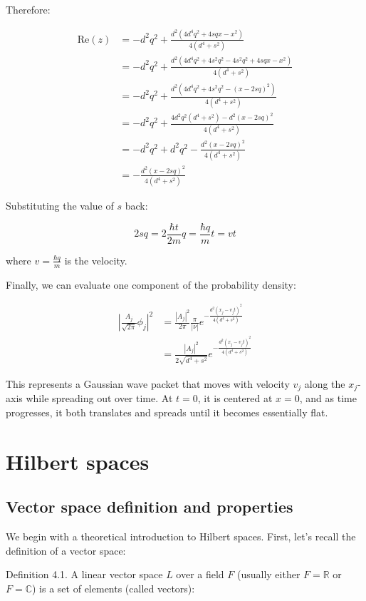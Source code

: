 \documentclass[italian]{HKNdocument}
\begin{document}
Therefore:

\begin{align}
\text{Re}(z) &= -d^2q^2+\frac{d^2(4d^4q^2+4sqx-x^2)}{4(d^4+s^2)} \\
&= -d^2q^2+\frac{d^2(4d^4q^2+4s^2q^2-4s^2q^2+4sqx-x^2)}{4(d^4+s^2)} \\
&= -d^2q^2+\frac{d^2(4d^4q^2+4s^2q^2-(x-2sq)^2)}{4(d^4+s^2)} \\
&= -d^2q^2+\frac{4d^2q^2(d^4+s^2)-d^2(x-2sq)^2}{4(d^4+s^2)} \label{eq:3.21} \\
&= -d^2q^2+d^2q^2-\frac{d^2(x-2sq)^2}{4(d^4+s^2)} \\
&= -\frac{d^2(x-2sq)^2}{4(d^4+s^2)}
\end{align}

Substituting the value of $s$ back:

\begin{equation}
2sq = 2\frac{\hbar t}{2m}q = \frac{\hbar q}{m}t = vt \label{eq:3.22}
\end{equation}

where $v = \frac{\hbar q}{m}$ is the velocity.

Finally, we can evaluate one component of the probability density:

\begin{align}
\left|\frac{A_j}{\sqrt{2\pi}}\phi_j\right|^2 &= \frac{|A_j|^2}{2\pi}\frac{\pi}{|\nu|}e^{-\frac{d^2(x_j-v_jt)^2}{4(d^4+s^2)}} \\
&= \frac{|A_j|^2}{2\sqrt{d^4+s^2}}e^{-\frac{d^2(x_j-v_jt)^2}{4(d^4+s^2)}} \label{eq:3.23}
\end{align}

This represents a Gaussian wave packet that moves with velocity $v_j$ along the $x_j$-axis while spreading out over time. At $t=0$, it is centered at $x=0$, and as time progresses, it both translates and spreads until it becomes essentially flat.

\section{Hilbert spaces}
\subsection{Vector space definition and properties}

We begin with a theoretical introduction to Hilbert spaces. First, let's recall the definition of a vector space:

Definition 4.1. A linear vector space $L$ over a field $F$ (usually either $F=\mathbb{R}$ or $F=\mathbb{C}$) is a set of elements (called vectors):
\end{document}
